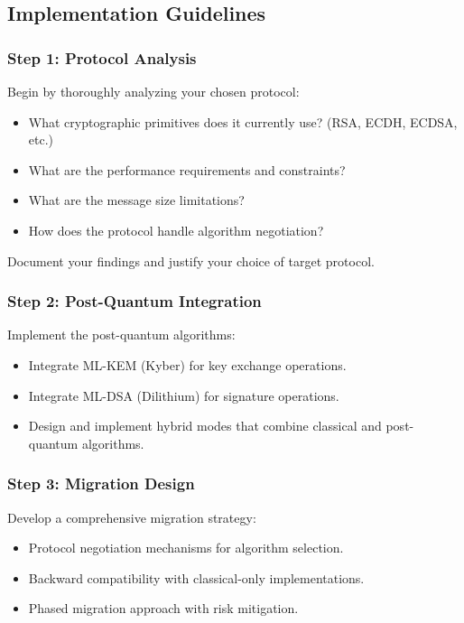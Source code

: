 \documentclass[10pt,a4paper,american]{exam}
\begin{document}
\subsection*{Implementation Guidelines}

\subsubsection*{Step 1: Protocol Analysis}
Begin by thoroughly analyzing your chosen protocol:
\begin{itemize}
	\item What cryptographic primitives does it currently use? (RSA, ECDH, ECDSA, etc.)
	\item What are the performance requirements and constraints?
	\item What are the message size limitations?
	\item How does the protocol handle algorithm negotiation?
\end{itemize}

Document your findings and justify your choice of target protocol.

\subsubsection*{Step 2: Post-Quantum Integration}
Implement the post-quantum algorithms:
\begin{itemize}
	\item Integrate ML-KEM (Kyber) for key exchange operations.
	\item Integrate ML-DSA (Dilithium) for signature operations.
	\item Design and implement hybrid modes that combine classical and post-quantum algorithms.
\end{itemize}

\subsubsection*{Step 3: Migration Design}
Develop a comprehensive migration strategy:
\begin{itemize}
	\item Protocol negotiation mechanisms for algorithm selection.
	\item Backward compatibility with classical-only implementations.
	\item Phased migration approach with risk mitigation.
\end{itemize}
\end{document}

